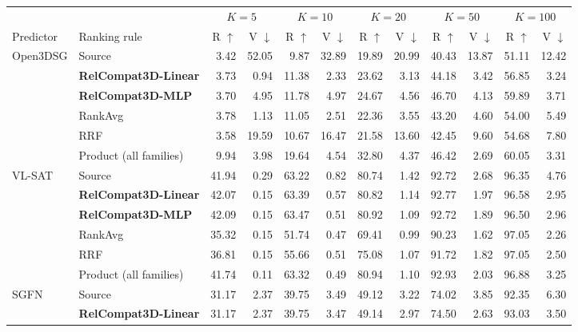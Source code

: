 \documentclass[letterpaper]{article}
\begin{document}
\begin{table}[!t]
\centering
{\small
\setlength{\tabcolsep}{2.0pt}
\begin{tabular}{@{}llrrrrrrrrrr@{}}
\toprule
& & \multicolumn{2}{c}{$K=5$} & \multicolumn{2}{c}{$K=10$} &
\multicolumn{2}{c}{$K=20$} & \multicolumn{2}{c}{$K=50$} &
\multicolumn{2}{c}{$K=100$} \\
\cmidrule(lr){3-4}\cmidrule(lr){5-6}\cmidrule(lr){7-8}\cmidrule(lr){9-10}\cmidrule(lr){11-12}
Predictor & Ranking rule & R $\uparrow$ & V $\downarrow$ & R $\uparrow$ & V $\downarrow$ & R $\uparrow$ & V $\downarrow$ & R $\uparrow$ & V $\downarrow$ & R $\uparrow$ & V $\downarrow$ \\
\midrule
\multirow{6}{*}{Open3DSG}
& Source & 3.42 & 52.05 & 9.87 & 32.89 & 19.89 & 20.99 & 40.43 & 13.87 & 51.11 & 12.42 \\
& \textbf{RelCompat3D-Linear} & 3.73 & 0.94 & 11.38 & 2.33 & 23.62 & 3.13 & 44.18 & 3.42 & 56.85 & 3.24 \\
& \textbf{RelCompat3D-MLP} & 3.70 & 4.95 & 11.78 & 4.97 & 24.67 & 4.56 & 46.70 & 4.13 & 59.89 & 3.71 \\
& RankAvg & 3.78 & 1.13 & 11.05 & 2.51 & 22.36 & 3.55 & 43.20 & 4.60 & 54.00 & 5.49 \\
& RRF & 3.58 & 19.59 & 10.67 & 16.47 & 21.58 & 13.60 & 42.45 & 9.60 & 54.68 & 7.80 \\
& Product (all families) & 9.94 & 3.98 & 19.64 & 4.54 & 32.80 & 4.37 & 46.42 & 2.69 & 60.05 & 3.31 \\
\midrule
\multirow{6}{*}{VL-SAT}
& Source & 41.94 & 0.29 & 63.22 & 0.82 & 80.74 & 1.42 & 92.72 & 2.68 & 96.35 & 4.76 \\
& \textbf{RelCompat3D-Linear} & 42.07 & 0.15 & 63.39 & 0.57 & 80.82 & 1.14 & 92.77 & 1.97 & 96.58 & 2.95 \\
& \textbf{RelCompat3D-MLP} & 42.09 & 0.15 & 63.47 & 0.51 & 80.92 & 1.09 & 92.72 & 1.89 & 96.50 & 2.96 \\
& RankAvg & 35.32 & 0.15 & 51.74 & 0.47 & 69.41 & 0.99 & 90.23 & 1.62 & 97.05 & 2.26 \\
& RRF & 36.81 & 0.15 & 55.66 & 0.51 & 75.08 & 1.07 & 91.72 & 1.82 & 97.05 & 2.50 \\
& Product (all families) & 41.74 & 0.11 & 63.32 & 0.49 & 80.94 & 1.10 & 92.93 & 2.03 & 96.88 & 3.25 \\
\midrule
\multirow{6}{*}{SGFN}
& Source & 31.17 & 2.37 & 39.75 & 3.49 & 49.12 & 3.22 & 74.02 & 3.85 & 92.35 & 6.30 \\
& \textbf{RelCompat3D-Linear} & 31.17 & 2.37 & 39.75 & 3.47 & 49.14 & 2.97 & 74.50 & 2.63 & 93.03 & 3.50 \\

\end{tabular}}
\end{table}
\end{document}
